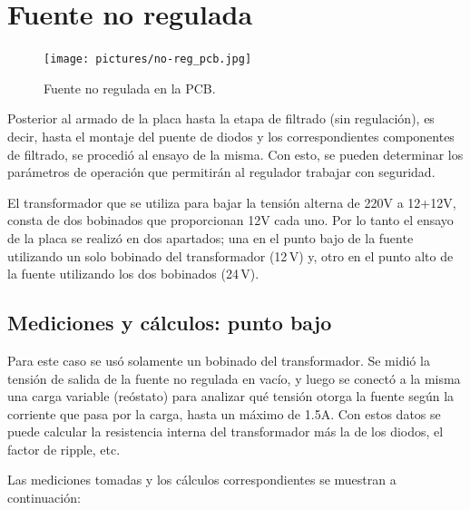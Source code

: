 \documentclass[chaptersright]{informeutn}
\begin{document}
    \section{Fuente no regulada}
      \begin{figure}
        \centering
        \texttt{[image: pictures/no-reg\_pcb.jpg]}
        \caption{Fuente no regulada en la PCB.}
      \end{figure}
      Posterior al armado de la placa hasta la etapa de filtrado (sin regulación), es decir, hasta el montaje del
      puente de diodos y los correspondientes componentes de filtrado, se procedió al ensayo de la misma. Con esto,
      se pueden determinar los parámetros de operación que permitirán al regulador trabajar con seguridad.

      El transformador que se utiliza para bajar la tensión alterna de 220V a 12+12V, consta de dos bobinados que
      proporcionan 12V cada uno. Por lo tanto el ensayo de la placa se realizó en dos apartados; una en el punto bajo
      de la fuente utilizando un solo bobinado del transformador (12\,V) y, otro en el punto alto de la fuente utilizando
      los dos bobinados (24\,V).

      \subsection{Mediciones y cálculos: punto bajo}
        Para este caso se usó solamente un bobinado del transformador. Se midió la tensión de salida de la fuente no
        regulada en vacío, y luego se conectó a la misma una carga variable (reóstato) para analizar qué tensión
        otorga la fuente según la corriente que pasa por la carga, hasta un máximo de 1.5A. Con estos datos se puede
        calcular la resistencia interna del transformador más la de los diodos, el factor de ripple, etc.

        Las mediciones tomadas y los cálculos correspondientes se muestran a continuación:
\end{document}
